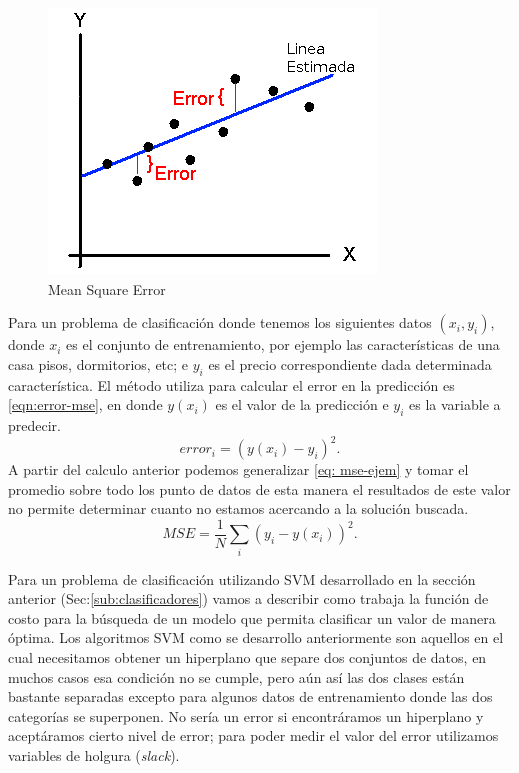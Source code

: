 \begin{figure}[H] \centering
  \includegraphics[scale=0.6,keepaspectratio=true,clip=true]{imagenes/MarcoTeorico/mse-cost.png}
  \caption{Mean Square Error \\ \citep{bishop}}\label{Fig:mse}
\end{figure}

Para un problema de clasificación donde tenemos los siguientes datos $(x_i,y_i) $, donde $x_i $ es el conjunto de entrenamiento, por ejemplo las características de una casa pisos, dormitorios, etc; e $y_i$ es el precio correspondiente dada determinada característica. El método utiliza para calcular el error en la predicción es \eqref{eqn:error-mse}, en donde $ y(x_i)$ es el valor de la predicción e $y_i$ es la variable a predecir.
\begin{equation}\label{eqn:error-mse}
error_i = (y(x_i) - y_i)^2.
\end{equation} 
A partir del calculo anterior podemos generalizar \eqref{eq: mse-ejem} y tomar el promedio sobre todo los punto de datos de esta manera el resultados de este valor no permite determinar cuanto no estamos acercando a la solución buscada.
\begin{equation}\label{eq: mse-ejem}
MSE =  \frac{1}{N}\sum_{i}(y_i - y(x_i))^2.
\end{equation}

Para un problema de clasificación utilizando  SVM desarrollado en la sección anterior (Sec:\ref{sub:clasificadores}) vamos a describir como trabaja la función de costo para la búsqueda  de un modelo que permita clasificar un valor de manera óptima. Los algoritmos SVM como se desarrollo anteriormente son aquellos en el cual necesitamos obtener un hiperplano que separe  dos conjuntos de datos, en  muchos casos esa condición no se cumple, pero aún así las dos clases están bastante separadas excepto para algunos datos de entrenamiento  donde las dos categorías se superponen. No sería un error si encontráramos un hiperplano y aceptáramos cierto nivel de error; para poder medir el valor del error  utilizamos variables de holgura (\emph{slack}).

